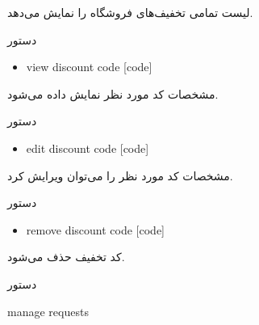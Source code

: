 \documentclass[]{article}
\begin{document}
لیست تمامی تخفیف‌های فروشگاه را نمایش می‌دهد.


\begin{mybox}[colback=brilliantlavender]{دستور}


\begin{latin}

\begin{itemize}[label = {$\Rightarrow$}]

\item
view discount code [code]

\end{itemize}

\end{latin}

\end{mybox}

مشخصات کد مورد نظر نمایش داده می‌شود.


\begin{mybox}[colback=brilliantlavender]{دستور}


\begin{latin}

\begin{itemize}[label = {$\Rightarrow$}]

\item
edit discount code [code]

\end{itemize}

\end{latin}

\end{mybox}


مشخصات کد مورد نظر را می‌توان ویرایش کرد.

\begin{mybox}[colback=brilliantlavender]{دستور}


\begin{latin}

\begin{itemize}[label = {$\Rightarrow$}]

\item
remove discount code [code]

\end{itemize}

\end{latin}

\end{mybox}


کد تخفیف حذف می‌شود.


\hrulefill


\begin{mybox}[colback=yellow]{دستور}

\begin{latin}

manage requests

\end{latin}

\end{mybox}
\end{document}
